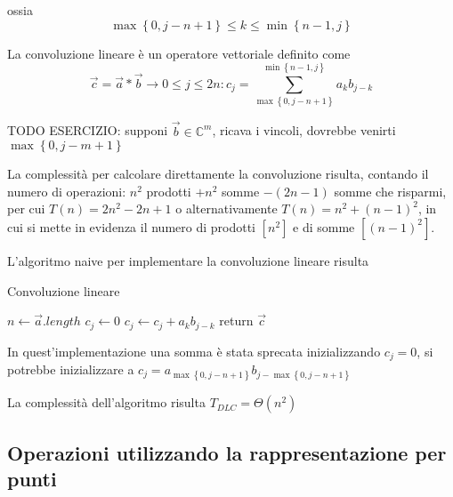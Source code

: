 ossia
\begin{equation*}
    \max\left\{ 0, j-n+1 \right\} \leq k \leq \min \left\{ n-1, j \right\}
\end{equation*}
\begin{definition}
    La convoluzione lineare è un operatore vettoriale definito come
    \begin{equation*}
        \vec{c}=\vec{a} * \vec{b} \rightarrow 0\leq j \leq 2n : c_j = \sum_{\max\left\{ 0, j-n+1 \right\}}^{\min \left\{ n-1, j \right\}} a_k b_{j-k}
    \end{equation*}
    \label{def:convlin}
\end{definition}
TODO ESERCIZIO: supponi $\vec{b} \in \mathbb{C}^m$, ricava i vincoli, dovrebbe venirti $\max \left\{ 0, j-m+1 \right\}$

La complessità per calcolare direttamente la convoluzione risulta, contando il numero di operazioni: $n^2$ prodotti $+n^2$ somme $-(2n-1)$ somme che risparmi, per cui $T(n)=2n^2-2n+1$ o alternativamente $T(n)=n^2+(n-1)^2$, in cui si mette in evidenza il numero di prodotti $\left[ n^2 \right]$ e di somme $\left[ (n-1)^2 \right]$.

L'algoritmo naive per implementare la convoluzione lineare risulta
\begin{algorithm}[H]
\caption{Convoluzione lineare}\label{alg:convlinnaive}
\begin{algorithmic}[1]
        \State $n \gets \vec{a}.length$
            \State $c_j \gets 0$
                \State $c_j \gets c_j + a_k b_{j-k}$
            \EndFor
        \EndFor
        \State return $ \vec{c}$
    \EndProcedure
\end{algorithmic}
\end{algorithm}
In quest'implementazione una somma è stata sprecata inizializzando $c_j=0$, si potrebbe inizializzare a $c_j=a_{\max\left\{ 0, j-n+1 \right\}}b_{j-\max\left\{ 0, j-n+1 \right\}}$

La complessità dell'algoritmo risulta $T_{DLC} = \Theta \left( n^2 \right)$
\subsection{Operazioni utilizzando la rappresentazione per punti}

